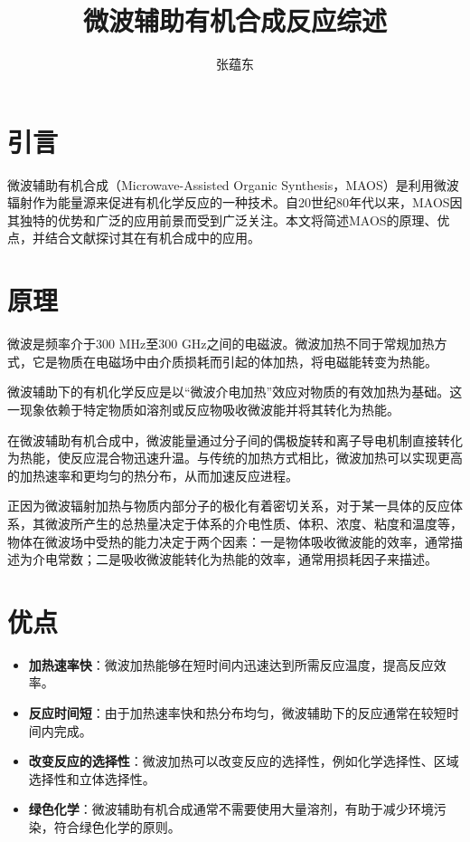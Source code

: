 \documentclass{article}
\title{微波辅助有机合成反应综述}
\author{张蕴东}
\date{ }
\begin{document}
\maketitle

\section*{引言}
微波辅助有机合成（Microwave-Assisted Organic Synthesis，MAOS）是利用微波辐射作为能量源来促进有机化学反应的一种技术。自20世纪80年代以来，MAOS因其独特的优势和广泛的应用前景而受到广泛关注。本文将简述MAOS的原理、优点，并结合文献探讨其在有机合成中的应用。

\section*{原理}
微波是频率介于300 MHz至300 GHz之间的电磁波。微波加热不同于常规加热方式，它是物质在电磁场中由介质损耗而引起的体加热，将电磁能转变为热能。\par
微波辅助下的有机化学反应是以“微波介电加热”效应对物质的有效加热为基础。这一现象依赖于特定物质如溶剂或反应物吸收微波能并将其转化为热能。\par
在微波辅助有机合成中，微波能量通过分子间的偶极旋转和离子导电机制直接转化为热能，使反应混合物迅速升温。与传统的加热方式相比，微波加热可以实现更高的加热速率和更均匀的热分布，从而加速反应进程。\par
正因为微波辐射加热与物质内部分子的极化有着密切关系，对于某一具体的反应体系，其微波所产生的总热量决定于体系的介电性质、体积、浓度、粘度和温度等，   物体在微波场中受热的能力决定于两个因素：一是物体吸收微波能的效率，通常描述为介电常数；二是吸收微波能转化为热能的效率，通常用损耗因子来描述。


\section*{优点}
\begin{itemize}
    \item \textbf{加热速率快}：微波加热能够在短时间内迅速达到所需反应温度，提高反应效率。
    \item \textbf{反应时间短}：由于加热速率快和热分布均匀，微波辅助下的反应通常在较短时间内完成。
    \item \textbf{改变反应的选择性}：微波加热可以改变反应的选择性，例如化学选择性、区域选择性和立体选择性。
    \item \textbf{绿色化学}：微波辅助有机合成通常不需要使用大量溶剂，有助于减少环境污染，符合绿色化学的原则。
\end{itemize}
\end{document}
